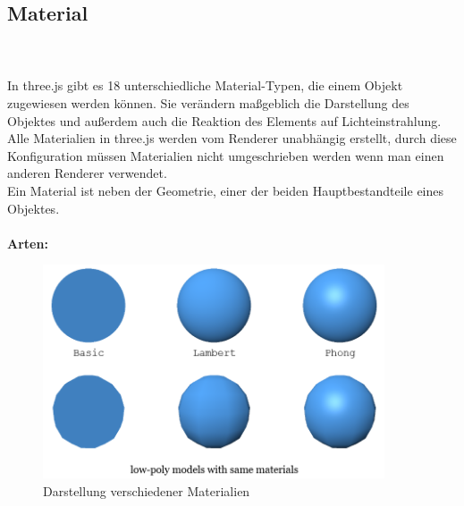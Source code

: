 \subsection{Material}
\\ \cite{material} \\
In three.js gibt es 18 unterschiedliche Material-Typen, die einem Objekt zugewiesen werden können. Sie verändern maßgeblich die Darstellung des Objektes und außerdem auch die Reaktion des Elements auf Lichteinstrahlung. Alle Materialien in three.js werden vom Renderer unabhängig erstellt, durch diese Konfiguration müssen Materialien nicht umgeschrieben werden wenn man einen anderen Renderer verwendet. \\
Ein Material ist neben der Geometrie, einer der beiden Hauptbestandteile eines Objektes.
\\ \\
\textbf{Arten:}  \cite{three.js_material} \\
\begin{figure}[h]
    \centering
    \includegraphics[width=0.9\textwidth]{images/materials.png}
    \caption{Darstellung verschiedener Materialien}
    \label{fig:my_label}
\end{figure}
